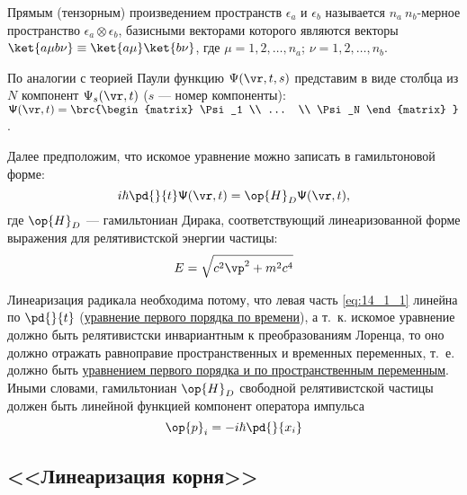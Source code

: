\begin{defn}
Прямым (тензорным) произведением пространств $\epsilon_a$ и $\epsilon_b$ называется $n_a~n_b$-мерное пространство $\epsilon_a \otimes \epsilon_b$, базисными векторами которого являются векторы $\ket{a \mu b \nu} \equiv \ket{a \mu}\ket{b \nu}$, где  
$\mu = 1, 2, \dots, n_a$; $\nu = 1, 2, \dots, n_b$.
\end{defn}

По аналогии с теорией Паули функцию $\Psi(\vr, t, s)$ представим в виде столбца из $N$ компонент $\Psi_s(\vr, t)$ ($s$ --- номер компоненты): $\mathsf{\Psi}(\vr, t) = 
\brc{\begin{matrix}
\Psi_1 \\
... \\
\Psi_N
\end{matrix} }
$.

Далее предположим, что искомое уравнение можно записать в гамильтоновой форме:
\begin{equation}
\label{eq:14_1_1}
i\hbar \pd{}{t} \mathsf{\Psi}(\vr, t) = \op{H}_D \mathsf{\Psi}(\vr, t),
\end{equation}
где $\op{H}_D$ --- гамильтониан Дирака, соответствующий линеаризованной форме выражения для релятивистской энергии частицы:
\begin{equation}
\label{eq:14_1_2}
E = \sqrt{c^2 \vp^2 + m^2 c^4}
\end{equation}
 
Линеаризация радикала необходима потому, что левая часть \eqref{eq:14_1_1} линейна по $\pd{}{t}$ (\underline{уравнение первого порядка по времени}), а т.~к. искомое уравнение должно быть релятивистски инвариантным к преобразованиям Лоренца, то оно должно отражать равноправие пространственных и временных переменных, т.~е. должно быть \underline{уравнением первого порядка и по пространственным переменным}. Иными словами, гамильтониан $\op{H}_D$ свободной релятивистской частицы должен быть линейной функцией компонент оператора импульса 
$$
\op{p}_i = - i\hbar \pd{}{x_i}
$$

\subsection{<<Линеаризация корня>>}

